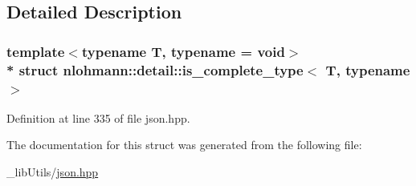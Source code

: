 \subsection{Detailed Description}
\subsubsection*{template$<$typename T, typename = void$>$\\*
struct nlohmann\+::detail\+::is\+\_\+complete\+\_\+type$<$ T, typename $>$}



Definition at line 335 of file json.\+hpp.



The documentation for this struct was generated from the following file\+:\begin{DoxyCompactItemize}
\item 
\+\_\+lib\+Utils/\hyperlink{json_8hpp}{json.\+hpp}\end{DoxyCompactItemize}
